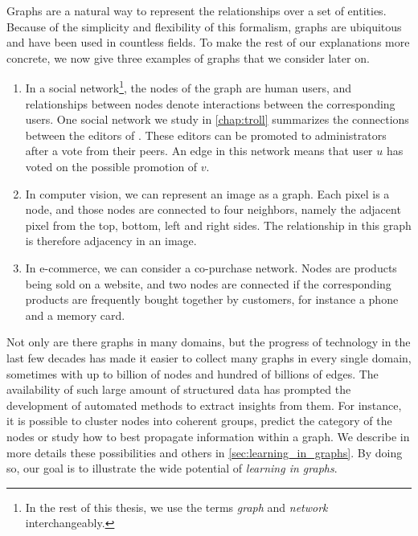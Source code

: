 Graphs are a natural way to represent the relationships over a set of entities. Because of the
simplicity and flexibility of this formalism, graphs are ubiquitous and have been used in countless
fields. To make the rest of our explanations more concrete, we now give three examples of graphs
that we consider later on.
\begin{enumerate}[nosep]%
\item In a social network\footnote{In the rest of this thesis, we use the terms \emph{graph} and
\emph{network} interchangeably.}, the nodes of the graph are human users, and relationships
between nodes denote interactions between the corresponding users. One social network we study
in \autoref{chap:troll} summarizes the connections between the editors of \wik{}. These editors
can be promoted to administrators after a vote from their peers. An edge \euv{} in this network
means that user $u$ has voted on the possible promotion of $v$.
\item In computer vision, we can represent an image as a graph. Each pixel is a node, and those
nodes are connected to four neighbors, namely the adjacent pixel from the top, bottom, left and
right sides. The relationship in this graph is therefore adjacency in an image.
\item In e-commerce, we can consider a co-purchase network. Nodes are products being sold on a
website, and two nodes are connected if the corresponding products are frequently bought
together by customers, for instance a phone and a memory card.
\end{enumerate}

Not only are there graphs in many domains, but the progress of technology in the last few decades
has made it easier to collect many graphs in every single domain, sometimes with up to billion of
nodes and hundred of billions of edges. The availability of such large amount of structured data has
prompted the development of automated methods to extract insights from them. For instance, it is
possible to cluster nodes into coherent groups, predict the category of the nodes or study how to
best propagate information within a graph. We describe in more details these possibilities and
others in \autoref{sec:learning_in_graphs}. By doing so, our goal is to illustrate the wide
potential of \emph{learning in graphs}.

\medskip

